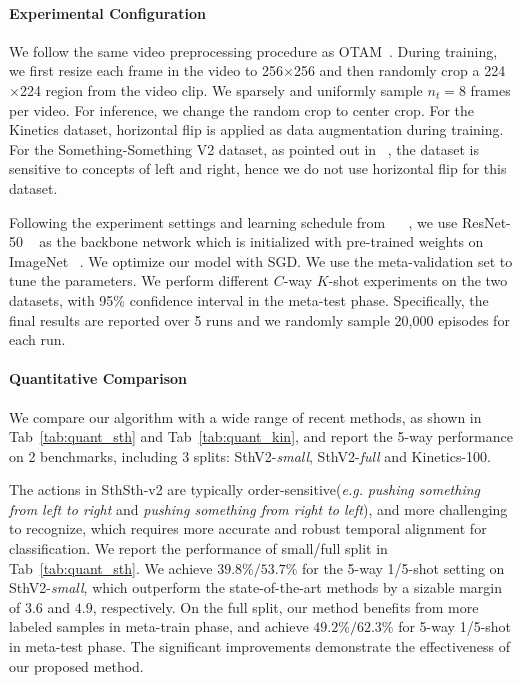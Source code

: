 \documentclass{article}
\begin{document}
\paragraph{Experimental Configuration}

We follow the same video preprocessing procedure as OTAM~\cite{cao2020few}. During training, we first resize each frame in the video to 256$\times$256 and then randomly crop a 224$\times$224 region from the video clip. We sparsely and uniformly sample $n_t=8$ frames per video. For inference, we change the random crop to center crop. For the Kinetics dataset, horizontal flip is applied as data augmentation during training. For the Something-Something V2 dataset, as pointed out in ~\cite{cao2020few}, the dataset is sensitive to concepts of left and right, hence we do not use horizontal flip for this dataset. 


Following the experiment settings and learning schedule from ~\cite{zhu2018compound} ~\cite{cao2020few}, we use ResNet-50 ~\cite{he2016deep} as the backbone network which is initialized with pre-trained weights on ImageNet ~\cite{deng2009imagenet}. We optimize our model with SGD. We use the meta-validation set to tune the parameters.
We perform different $C$-way $K$-shot experiments on the two datasets, with 95\% confidence interval in the meta-test phase. 
Specifically, the final results are reported over 5 runs and we randomly sample 20,000 episodes for each run. 






\paragraph{Quantitative Comparison}
We compare our algorithm with a wide range of recent methods, as shown in Tab~\ref{tab:quant_sth} and Tab~\ref{tab:quant_kin},
and report the 5-way performance on 2 benchmarks, including 3 splits: SthV2-\textit{small}, SthV2-\textit{full} and Kinetics-100. 


 The actions in SthSth-v2 are typically order-sensitive(\textit{e.g.} \textit{pushing something from left to right} and \textit{pushing something from right to left}), and more challenging to recognize, which requires more accurate and robust temporal alignment for classification. We report the performance of small/full split in Tab~\ref{tab:quant_sth}. We achieve $\mathbf{39.8\%}/\mathbf{53.7\%}$ for the 5-way 1/5-shot setting on SthV2-\textit{small}, which outperform the state-of-the-art methods by a sizable margin of $\mathbf{3.6}$ and $\mathbf{4.9}$, respectively. On the full split, our method benefits from more labeled samples in meta-train phase, and achieve $\mathbf{49.2\%}/\mathbf{62.3\%}$ for 5-way 1/5-shot in meta-test phase. The significant improvements demonstrate the effectiveness of our proposed method.
 
\end{document}
